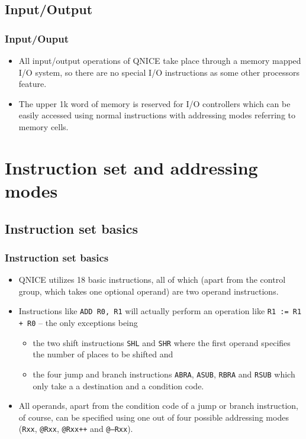 \documentclass{beamer}
\begin{document}
  \subsection{Input/Output}
   \begin{frame}
    \frametitle{Input/Ouput}
    \begin{itemize}
     \item All input/output operations of QNICE take place through
      a memory mapped I/O system, so there are no special I/O instructions
      as some other processors feature.
     \item The upper 1k word of memory is reserved for I/O controllers
      which can be easily accessed using normal instructions with
      addressing modes referring to memory cells.
    \end{itemize}
   \end{frame}
%
 \section{Instruction set and addressing modes}
  \subsection{Instruction set basics}
   \begin{frame}
    \frametitle{Instruction set basics}
    \begin{itemize}
     \item QNICE utilizes 18 basic instructions, all of which (apart
      from the control group, which takes one optional operand) are two 
      operand instructions. 
     \item Instructions like {\tt ADD R0, R1} will actually perform an
      operation like {\tt R1 := R1 + R0} -- the only exceptions being
      \begin{itemize}
       \item the two shift instructions {\tt SHL} and {\tt SHR} where the 
        first operand specifies the number of places to be shifted and
       \item the four jump and branch instructions {\tt ABRA}, {\tt ASUB},
        {\tt RBRA} and {\tt RSUB} which only take a 
        a destination and a condition code.
      \end{itemize}
     \item All operands, apart from the condition code of a jump or
      branch instruction, of course, can be specified using one out
      of four possible addressing modes ({\tt Rxx}, {\tt @Rxx}, {\tt @Rxx++} 
      and {\tt @--Rxx}).
    \end{itemize}
   \end{frame}
%
\end{document}
